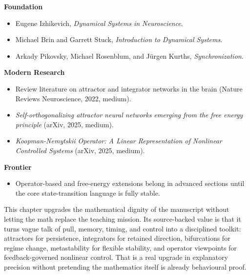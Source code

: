 \begin{readingbox}
\textbf{Foundation}
\begin{itemize}[nosep]
  \item Eugene Izhikevich, \emph{Dynamical Systems in Neuroscience}.
  \item Michael Brin and Garrett Stuck, \emph{Introduction to Dynamical
        Systems}.
  \item Arkady Pikovsky, Michael Rosenblum, and J\"urgen Kurths,
        \emph{Synchronization}.
\end{itemize}
\textbf{Modern Research}
\begin{itemize}[nosep]
  \item Review literature on attractor and integrator networks in the brain
        (Nature Reviews Neuroscience, 2022, medium).
  \item \emph{Self-orthogonalizing attractor neural networks emerging from the
        free energy principle} (arXiv, 2025, medium).
  \item \emph{Koopman-Nemytskii Operator: A Linear Representation of Nonlinear
        Controlled Systems} (arXiv, 2025, medium).
\end{itemize}
\textbf{Frontier}
\begin{itemize}[nosep]
  \item Operator-based and free-energy extensions belong in advanced sections
        until the core state-transition language is fully stable.
\end{itemize}
\end{readingbox}

\begin{summarybox}
This chapter upgrades the mathematical dignity of the manuscript without
letting the math replace the teaching mission. Its source-backed value is that
it turns vague talk of pull, memory, timing, and control into a disciplined
toolkit: attractors for persistence, integrators for retained direction,
bifurcations for regime change, metastability for flexible stability, and
operator viewpoints for feedback-governed nonlinear control. That is a real
upgrade in explanatory precision without pretending the mathematics itself is
already behavioural proof.
\end{summarybox}
